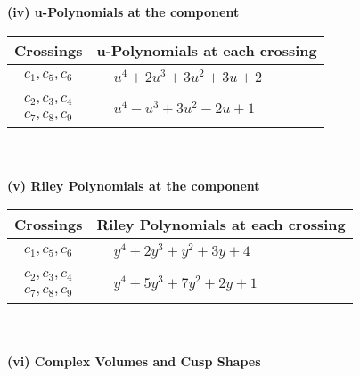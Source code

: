 \documentclass[1p]{elsarticle_modified}
\theoremstyle{definition}
\begin{document}
\newpage\renewcommand{\arraystretch}{1}
\flushleft \textbf{(iv) u-Polynomials at the component}\newline \\
\begin{tabular}{m{50pt}|m{274pt}}
Crossings & \hspace{64pt}u-Polynomials at each crossing \\
\hline $$\begin{aligned}c_{1},c_{5},c_{6}\end{aligned}$$&$\begin{aligned}
&u^4+2 u^3+3 u^2+3 u+2
\end{aligned}$\\
\hline $$\begin{aligned}c_{2},c_{3},c_{4}\\c_{7},c_{8},c_{9}\end{aligned}$$&$\begin{aligned}
&u^4- u^3+3 u^2-2 u+1
\end{aligned}$\\
\hline
\end{tabular}\\~\\
\newpage\renewcommand{\arraystretch}{1}
\flushleft \textbf{(v) Riley Polynomials at the component}\newline \\
\begin{tabular}{m{50pt}|m{274pt}}
Crossings & \hspace{64pt}Riley Polynomials at each crossing \\
\hline $$\begin{aligned}c_{1},c_{5},c_{6}\end{aligned}$$&$\begin{aligned}
&y^4+2 y^3+y^2+3 y+4
\end{aligned}$\\
\hline $$\begin{aligned}c_{2},c_{3},c_{4}\\c_{7},c_{8},c_{9}\end{aligned}$$&$\begin{aligned}
&y^4+5 y^3+7 y^2+2 y+1
\end{aligned}$\\
\hline
\end{tabular}\\~\\
\newpage\flushleft \textbf{(vi) Complex Volumes and Cusp Shapes}
\end{document}
